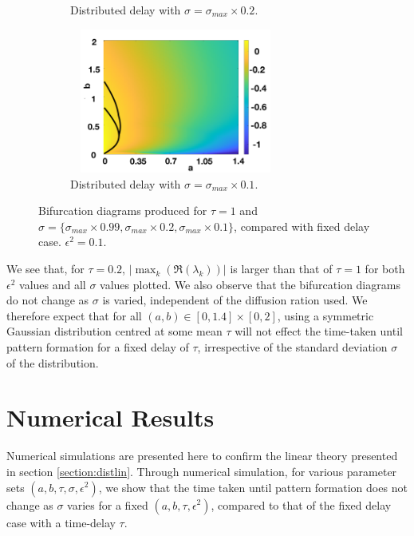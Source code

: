 \documentclass[12pt]{report}
\begin{document}
\begin{figure}[H]
\begin{subfigure}[b]{0.45\textwidth}
        \caption{Distributed delay with $\sigma=\sigma_{max}\times0.2$.}
        \label{}
    \end{subfigure}
    \hfill
    \begin{subfigure}[b]{0.45\textwidth}
        \centering
        \includegraphics[width=7cm,height=4.75cm]{distbif44.png}
        \caption{Distributed delay with $\sigma=\sigma_{max}\times0.1$.}
        \label{}
    \end{subfigure}
    \caption{Bifurcation diagrams produced for $\tau=1$ and $\sigma=\{ \sigma_{max}\times0.99,\sigma_{max}\times0.2,\sigma_{max}\times0.1 \}$, compared with fixed delay case. $\epsilon^2=0.1$.}
    \label{fig:distbif4}
\end{figure}

We see that, for $\tau=0.2$, $|\max_k(\Re(\lambda_k))|$ is larger than that of $\tau=1$ for both $\epsilon^2$ values and all $\sigma$ values plotted. We also observe that the bifurcation diagrams do not change as $\sigma$ is varied, independent of the diffusion ration used. We therefore expect that for all $(a,b)\in[0,1.4]\times[0,2]$, using a symmetric Gaussian distribution centred at some mean $\tau$ will not effect the time-taken until pattern formation for a fixed delay of $\tau$, irrespective of the standard deviation $\sigma$ of the distribution.


\section{Numerical Results}\label{section:distsim}
Numerical simulations are presented here to confirm the linear theory presented in section \ref{section:distlin}. Through numerical simulation, for various parameter sets $(a,b,\tau,\sigma,\epsilon^2)$, we show that the time taken until pattern formation does not change as $\sigma$ varies for a fixed $(a,b,\tau,\epsilon^2)$, compared to that of the fixed delay case with a time-delay $\tau$.






\printbibliography
\end{document}
